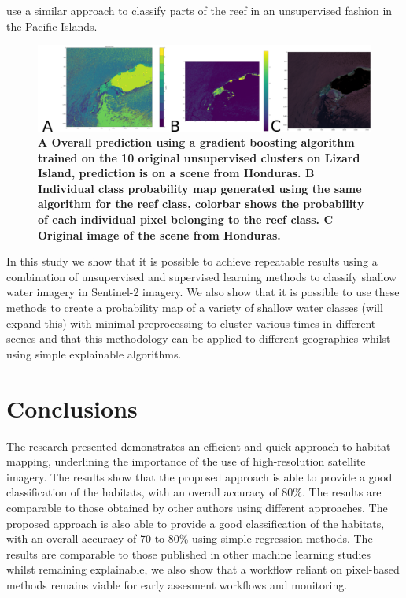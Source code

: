 \documentclass[journal,article,submit,pdftex,moreauthors]{Definitions/mdpi}
\begin{document}
\cite{immordino2019application} use a similar approach to classify parts of the reef in an unsupervised fashion in the Pacific Islands. 

\begin{figure}
	\centering
	\includegraphics[width=0.7\linewidth]{Images/Honduras_Prediction.png}
	\caption{\bf{A} Overall prediction using a gradient boosting algorithm trained on the 10 original unsupervised clusters on Lizard Island, prediction is on a scene from Honduras. \bf{B} Individual class probability map generated using the same algorithm for the reef class, colorbar shows the probability of each individual pixel belonging to the reef class.
	\bf{C} Original image of the scene from Honduras.}
	\label{fig:UnsupervisedWorkflow}
\end{figure}
In this study we show that it is possible to achieve repeatable results using a combination of unsupervised and supervised learning methods to classify shallow water imagery in Sentinel-2 imagery. 
We also show that it is possible to use these methods to create a probability map of a variety of shallow water classes (will expand this) with minimal preprocessing to cluster various times in different scenes and that this methodology can be applied to different 
geographies whilst using simple explainable algorithms. 

\section{Conclusions}

The research presented demonstrates an efficient and quick approach to habitat mapping, underlining the importance of the use of high-resolution satellite imagery. The results show that the proposed approach is able to provide a good classification of the habitats, with an overall accuracy of 80\%. The results are comparable to those obtained by other authors using different approaches. The proposed approach is also able to provide a good classification of the habitats, with an overall accuracy of 70 to 80\% using simple regression methods. 
The results are comparable to those published in other machine learning studies whilst remaining explainable, we also show that a workflow reliant on pixel-based methods remains viable for early assesment workflows and monitoring.
\end{document}
